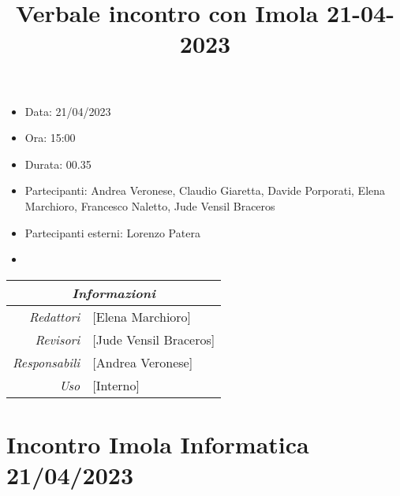 \documentclass[12pt]{article}
\begin{document}
\graphicspath{ {../../templates/img} }

\title{Verbale incontro con Imola 21-04-2023}
\firstPage
\maketitle

\begin{center}
    \begin{itemize}
        \item[] Data: 21/04/2023
        \item[] Ora: 15:00
        \item[] Durata: 00.35
        \item[] Partecipanti: Andrea Veronese, Claudio Giaretta, Davide Porporati, Elena Marchioro, Francesco Naletto, Jude Vensil Braceros
        \item[] Partecipanti esterni: Lorenzo Patera
        \item[] 
        \end{itemize}
    \begin{tabular}{r | l}
		\multicolumn{2}{c}{\textit{Informazioni}}\\
		\hline
		
			\textit{Redattori} &
			[Elena Marchioro]\makecell{}\\
		
			\textit{Revisori} &
			[Jude Vensil Braceros]\makecell{}\\
			\textit{Responsabili} &
			[Andrea Veronese]\makecell{}\\
		      \textit{Uso} & 
                [Interno]\makecell{}\\
\end{tabular}
\end{center}

\tableofcontents
\printindex
\section{Incontro Imola Informatica 21/04/2023}
\end{document}
